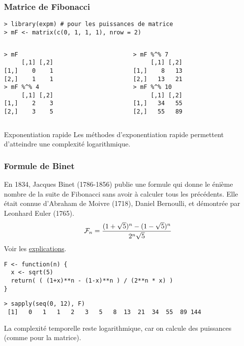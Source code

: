 \documentclass[10pt]{beamer}
\newcommand{\F}[1]{\ensuremath{{\cal F}_{#1}}\xspace}
\begin{document}
\begin{frame}[fragile]
  \frametitle{Matrice de Fibonacci }
  \begin{lstlisting}
> library(expm) # pour les puissances de matrice
> mF <- matrix(c(0, 1, 1, 1), nrow = 2)
\end{lstlisting}

\begin{columns}[t]
\begin{column}{0.48\textwidth}
  \begin{lstlisting}
> mF
     [,1] [,2]
[1,]    0    1
[2,]    1    1
> mF %^% 4
     [,1] [,2]
[1,]    2    3
[2,]    3    5
\end{lstlisting}

\end{column}
\begin{column}{0.48\textwidth}
  \begin{lstlisting}
> mF %^% 7
     [,1] [,2]
[1,]    8   13
[2,]   13   21
> mF %^% 10
     [,1] [,2]
[1,]   34   55
[2,]   55   89
\end{lstlisting}

\end{column}
\end{columns}


\begin{block}{Exponentiation rapide}
  Les méthodes d'exponentiation rapide permettent d'atteindre une \alert{complexité logarithmique}.
\end{block}
\end{frame}

\begin{frame}[fragile]
  \frametitle{Formule de Binet}
  En 1834, Jacques Binet (1786-1856) publie une formule qui donne le énième nombre de la suite de Fibonacci sans avoir à calculer tous les précédents.
  Elle était connue d'Abraham de Moivre (1718), Daniel Bernoulli, et démontrée par Leonhard Euler (1765).
  $$
  \F{n} = \frac{(1 + \sqrt{5})^n - (1 - \sqrt{5})^n}{2^n \sqrt{5}}
  $$
  Voir les \href{http://villemin.gerard.free.fr/Wwwgvmm/Iteration/Binet.htm}{explications}.
\begin{lstlisting}[style=edblock]
F <- function(n) {
  x <- sqrt(5)
  return( ( (1+x)**n - (1-x)**n ) / (2**n * x) )
}
\end{lstlisting}

\begin{lstlisting}
> sapply(seq(0, 12), F)
 [1]   0   1   1   2   3   5   8  13  21  34  55  89 144
\end{lstlisting}
\alert{La complexité temporelle reste logarithmique}, car on calcule des puissances (comme pour la matrice).
\end{frame}
\questionSlide
\end{document}
